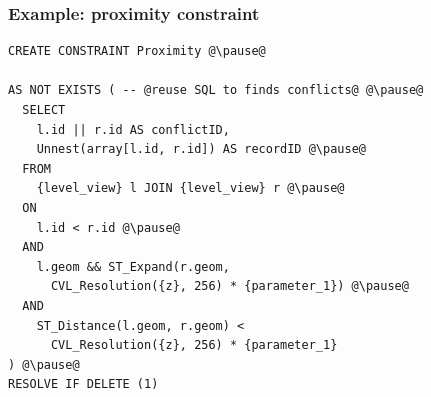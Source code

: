 \documentclass{beamer}
\begin{document}



\begin{frame}[fragile]
\frametitle{Example: proximity constraint}
\begin{lstlisting}[escapechar=@]
CREATE CONSTRAINT Proximity @\pause@

AS NOT EXISTS ( -- @reuse SQL to finds conflicts@ @\pause@
  SELECT  
    l.id || r.id AS conflictID, 
    Unnest(array[l.id, r.id]) AS recordID @\pause@
  FROM
    {level_view} l JOIN {level_view} r @\pause@
  ON
    l.id < r.id @\pause@
  AND
    l.geom && ST_Expand(r.geom, 
      CVL_Resolution({z}, 256) * {parameter_1}) @\pause@
  AND
    ST_Distance(l.geom, r.geom) < 
      CVL_Resolution({z}, 256) * {parameter_1} 
) @\pause@
RESOLVE IF DELETE (1)
\end{lstlisting}
\end{frame}


\end{document}
